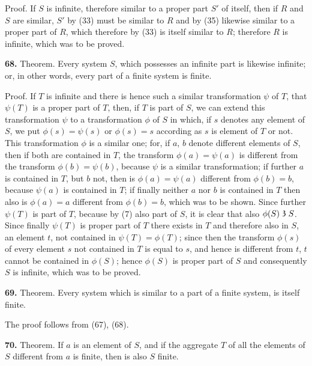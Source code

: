 \documentclass[oneside]{book}
\newcommand\partof{\mathrel{\raisebox{0.45ex}{$\mathfrak{3}$}}}   %
\newcommand\mypara{\medskip\textbf}
\begin{document}
Proof. If $S$ is infinite, therefore similar to a proper
part $S'$ of itself, then if $R$ and $S$ are similar, $S'$ by
(33) must be similar to $R$ and by (35) likewise similar
to a proper part of $R$, which therefore by (33) is itself
similar to $R$; therefore $R$ is infinite, which was to be
proved.

\mypara{68.} Theorem.  Every system $S$, which possesses
an infinite part is likewise infinite; or, in other words,
every part of a finite system is finite.


Proof. If $T$ is infinite and there is hence such a
similar transformation $\psi$ of $T$, that $\psi(T)$ is a proper
part of $T$, then, if $T$ is part of $S$, we can extend this
transformation $\psi$ to a transformation $\phi$ of $S$ in which,
if $s$ denotes any element of $S$, we put $\phi(s)=\psi(s)$ or
$\phi(s)=s$ according as $s$ is element of $T$ or not. This
transformation $\phi$ is a similar one; for, if $a$, $b$ denote
different elements of $S$, then if both are contained in
$T$, the transform $\phi(a)=\psi(a)$ is different from the
transform $\phi(b)=\psi(b)$, because $\psi$ is a similar transformation;
if further $a$ is contained in $T$, but $b$ not, then
is $\phi(a)=\psi(a)$ different from $\phi(b)=b$, because $\psi(a)$
is contained in $T$; if finally neither $a$ nor $b$ is contained
in $T$ then also is $\phi(a)=a$ different from $\phi(b)=b$,
which was to be shown. Since further $\psi(T)$ is part
of $T$, because by (7) also part of $S$, it is clear that also
$\phi(S) \partof S$. Since finally $\psi(T)$ is proper part of $T$ there
exists in $T$ and therefore also in $S$, an element $t$, not
contained in $\psi(T)=\phi(T)$; since then the transform
$\phi(s)$ of every element $s$ not contained in $T$ is equal to
$s$, and hence is different from $t$, $t$ cannot be contained
in $\phi(S)$; hence $\phi(S)$ is proper part of $S$ and consequently
$S$ is infinite, which was to be proved.

\mypara{69.} Theorem. Every system which is similar to
a part of a finite system, is itself finite.

The proof follows from (67), (68).

\mypara{70.} Theorem.  If $a$ is an element of $S$, and if the
aggregate $T$ of all the elements of $S$ different from $a$ is
finite, then is also $S$ finite.
\end{document}
